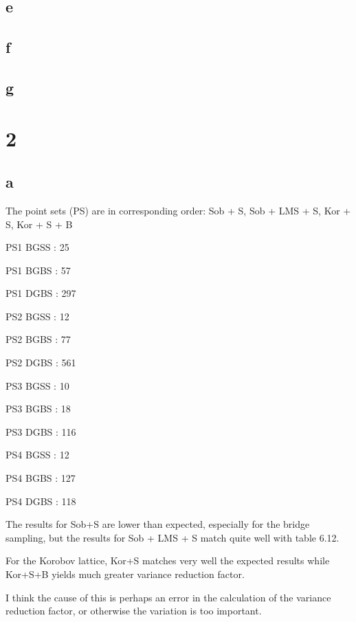 \documentclass[12pt]{report}
\begin{document}
\subsection*{e}


\subsection*{f}


\subsection*{g}


\section*{2}

\subsection*{a}

The point sets (PS) are in corresponding order: Sob + S, Sob + LMS + S, Kor + S, Kor + S + B

PS1 BGSS : 25

PS1 BGBS :  57

PS1 DGBS :  297

PS2 BGSS :  12

PS2 BGBS :  77

PS2 DGBS :  561

PS3 BGSS :  10

PS3 BGBS :  18

PS3 DGBS :  116

PS4 BGSS :  12

PS4 BGBS :  127

PS4 DGBS :  118


The results for Sob+S are lower than expected, especially for the bridge sampling, but the results for Sob + LMS + S match quite well with table 6.12.

For the Korobov lattice, Kor+S matches very well the expected results while Kor+S+B yields much greater variance reduction factor.

I think the cause of this is perhaps an error in the calculation of the variance reduction factor, or otherwise the variation is too important.
\end{document}
